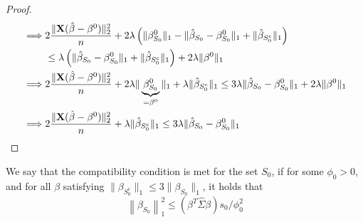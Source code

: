 \begin{proof}
\begin{align*}
        \implies & 2 \frac{\| \mathbf{X} (\hat{\beta}-\beta^{0})\|_{2}^{2}}{n} + 2 \lambda \left( \|\beta_{S_{0}}^{0} \|_{1} - \|\hat{\beta}_{S_{0}}-\beta_{S_{0}}^{0} \|_{1}+ \|\hat{\beta}_{S_{0}^{c}} \|_{1} \right)                                                                 \\
                 & \leq \lambda \left( \| \hat{\beta}_{S_{0}}-\beta_{S_{0}}^{0} \|_{1} + \|\hat{\beta}_{S_{0}^{c}} \|_{1} \right) + 2 \lambda \|\beta^{0} \|_{1}                                                                                                                \\
        \implies & 2 \frac{\| \mathbf{X} (\hat{\beta}-\beta^{0})\|_{2}^{2}}{n} + 2 \lambda \|\underbrace{\beta_{S_{0}}^{0}}_{= \beta^0} \|_{1} + \lambda \|\hat{\beta}_{S_{0}^{c}} \|_{1} \leq 3 \lambda \| \hat{\beta}_{S_{0}}-\beta_{S_{0}}^{0} \|_{1} + 2 \lambda \|\beta^{0} \|_{1} \\
        \implies & 2\frac{ \|\mathbf{X} (\hat{\beta}-\beta^{0} ) \|_{2}^{2}}{n} + \lambda \|\hat{\beta}_{S_{0}^{c}} \|_{1} \leq 3 \lambda \|\hat{\beta}_{S_{0}}-\beta_{S_{0}}^{0} \|_{1}
    \end{align*}
\end{proof}

\begin{definition}
    We say that the compatibility condition is met for the set $S_{0}$, if for some $\phi_{0}>0$, and for all $\beta$ satisfying $ \|\beta_{S_{0}^{c}} \|_{1} \leq 3 \|\beta_{S_{0}} \|_{1}$, it holds that
    \begin{equation}
        \left\| \beta_{S_{0}} \right\|_{1}^{2} \leq \left(\beta^{T} \hat{\Sigma} \beta\right) s_{0} / \phi_{0}^{2}
    \end{equation}
\end{definition}

